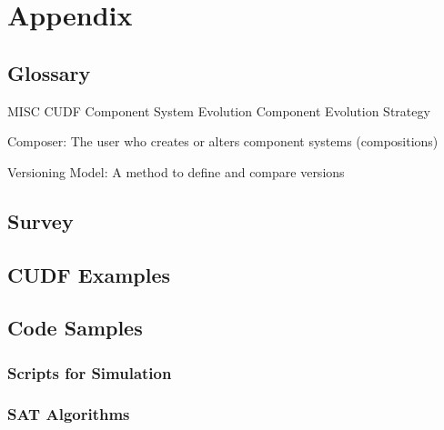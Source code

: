 \chapter{Appendix}

\section{Glossary}
MISC
CUDF
Component System Evolution
Component Evolution
Strategy


Composer: The user who creates or alters component systems (compositions)

Versioning Model: A method to define and compare versions

\section{Survey}
\label{apx.survey}

\section{CUDF Examples}

\section{Code Samples}
\subsection{Scripts for Simulation}
\subsection{SAT Algorithms}